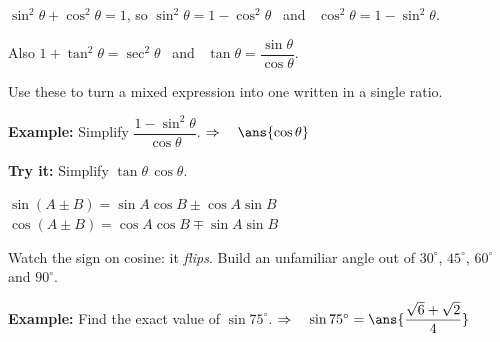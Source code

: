 \documentclass[12pt]{article}
\begin{document}


\begin{formulabox}
$\sin^2\theta + \cos^2\theta = 1$, \quad so \quad $\sin^2\theta = 1 - \cos^2\theta$ \ and \ $\cos^2\theta = 1 - \sin^2\theta$.\par
Also $1 + \tan^2\theta = \sec^2\theta$ \ and \ $\tan\theta = \dfrac{\sin\theta}{\cos\theta}$.\par
Use these to turn a mixed expression into one written in a single ratio.
\end{formulabox}

\begin{examplebox}
\textbf{Example:} \quad Simplify $\dfrac{1 - \sin^2\theta}{\cos\theta}$.
$\Rightarrow\quad \ans{\cos\theta}$
\end{examplebox}

\begin{tryitbox}
\textbf{Try it:} \quad Simplify $\tan\theta\,\cos\theta$.\\[2pt]
\end{tryitbox}


\begin{formulabox}
$\sin(A \pm B) = \sin A\cos B \pm \cos A\sin B$ \qquad $\cos(A \pm B) = \cos A\cos B \mp \sin A\sin B$\par
Watch the sign on cosine: it \emph{flips}. Build an unfamiliar angle out of $30^\circ$, $45^\circ$, $60^\circ$ and $90^\circ$.
\end{formulabox}

\begin{examplebox}
\textbf{Example:} \quad Find the exact value of $\sin 75^\circ$.
$\Rightarrow\quad \sin 75^\circ = \ans{\dfrac{\sqrt{6} + \sqrt{2}}{4}}$
\end{examplebox}
\end{document}
